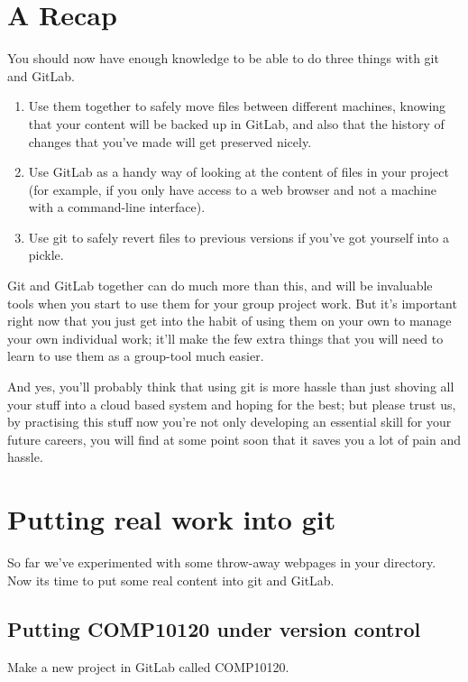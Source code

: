 \section{A Recap}

You should now have enough knowledge to be able to do three things with git and GitLab.

\begin{enumerate}
\item Use them together to safely move files between different machines, knowing that your content will be backed up in GitLab, and also that the history of changes that you've made will get preserved nicely.
\item Use GitLab as a handy way of looking at the content of files in your project (for example, if you only have access to a web browser and not a machine with a command-line interface).
\item Use git to safely revert files to previous versions if you've got yourself into a pickle. 
\end{enumerate}

Git and GitLab together can do much more than this, and will be invaluable tools when you start to use them for your group project work. But it's important right now that you just get into the habit of using them on your own to manage your own individual work; it'll make the few extra things that you will need to learn to use them as a group-tool much easier.

And yes, you'll probably think that using git is more hassle than just shoving all your stuff into a cloud based system and hoping for the best; but please trust us, by practising this stuff now you're not only developing an essential skill for your future careers, you will find at some point soon that it saves you a lot of pain and hassle. 

\section{Putting real work into git}

So far we've experimented with some throw-away webpages in your  directory. Now its time to put some real content into git and GitLab.

\subsection{Putting COMP10120 under version control}

Make a new project in GitLab called COMP10120. 

